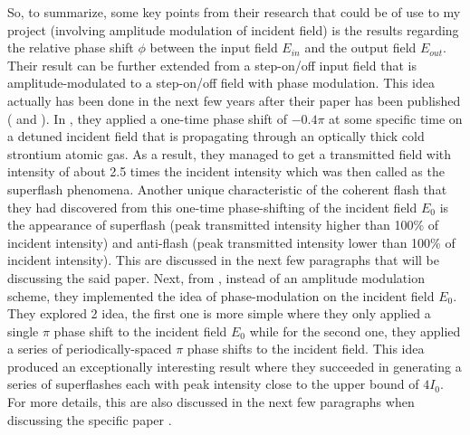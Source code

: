 So, to summarize, some key points from their research that could be of use to my project (involving amplitude modulation of incident field) is the results regarding the relative phase shift $\phi$ between the input field $E_{in}$ and the output field $E_{out}$. Their result can be further extended from a step-on/off input field that is amplitude-modulated to a step-on/off field with phase modulation. This idea actually has been done in the next few years after their paper \cite{Chalony2011} has been published (\cite{Kwong2014} and \cite{Kwong2015}). In \cite{Kwong2014}, they applied a one-time phase shift of $-0.4\pi$ at some specific time on a detuned incident field that is propagating through an optically thick cold strontium atomic gas. As a result, they managed to get a transmitted field with intensity of about 2.5 times the incident intensity which was then called as the superflash phenomena. Another unique characteristic of the coherent flash that they had discovered from this one-time phase-shifting  of the incident field $E_{0}$ is the appearance of superflash (peak transmitted intensity higher than 100\% of incident intensity) and anti-flash (peak transmitted intensity lower than 100\% of incident intensity). This are discussed in the next few paragraphs that will be discussing the said \cite{Kwong2014} paper. Next, from \cite{Kwong2015}, instead of an amplitude modulation scheme, they implemented the idea of phase-modulation on the incident field $E_{0}$. They explored 2 idea, the first one is more simple where they only applied a single $\pi$ phase shift to the incident field $E_{0}$ while for the second one, they applied a series of periodically-spaced $\pi$ phase shifts to the incident field. This idea produced an exceptionally interesting result where they succeeded in generating a series of superflashes each with peak intensity close to the upper bound of $4 I_{0}$. For more details, this are also discussed in the next few paragraphs when discussing the specific paper \cite{Kwong2015}.\\

